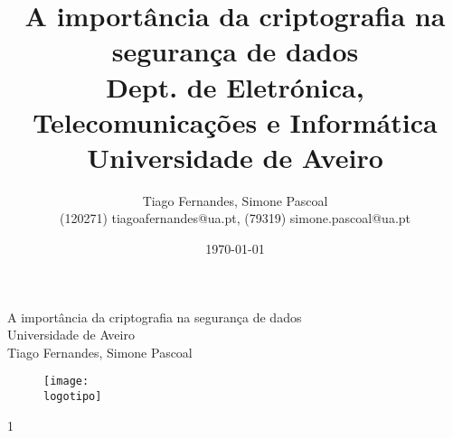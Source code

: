 \documentclass{report}
\begin{document}
%
\def\titulo{A importância da criptografia na segurança de dados}
\def\data{DATA}
\def\autores{Tiago Fernandes, Simone Pascoal}
\def\autorescontactos{(120271) tiagoafernandes@ua.pt, (79319) simone.pascoal@ua.pt}
\def\versao{1}
\def\departamento{Dept. de Eletrónica, Telecomunicações e Informática}
\def\empresa{Universidade de Aveiro}
\def\logotipo{ua.pdf}
%
%
\begin{titlepage}

\begin{center}
%
\vspace*{50mm}
%
{\Huge \titulo}\\ 
%
\vspace{10mm}
%
{\Large \empresa}\\
%
\vspace{10mm}
%
{\LARGE \autores}\\ 
%
\vspace{30mm}
%
\begin{figure}[h]
\center
\texttt{[image: \\logotipo]}
\end{figure}
%
\vspace{30mm}
\end{center}
%
\begin{flushright}
\versao
\end{flushright}
\end{titlepage}

\title{%
{\Huge\textbf{\titulo}}\\
{\Large \departamento\\ \empresa}
}
%
\author{%
    \autores \\
    \autorescontactos
}
%
\date{\today}
%
\maketitle

\end{document}
